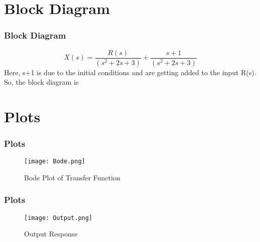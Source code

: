 \documentclass{beamer}
\theoremstyle{remark}
\numberwithin{equation}{section}
\begin{document}
\section{Block Diagram}
\begin{frame}
\frametitle{Block Diagram}
\begin{equation}
    X(s) = \frac{R(s)}{(s^2+2s+3)}+\frac{s+1}{(s^2+2s+3)}
\end{equation}
Here, s+1 is due to the initial conditions and are getting added to the input R(s). So, the block diagram is 

\vspace{5mm}


\end{frame}

\section{Plots}
\begin{frame}
\frametitle{Plots}
\begin{figure}[ht]
    \centering
    \texttt{[image: Bode.png]}
    \caption{Bode Plot of Transfer Function}
    \label{fig:my_label}
\end{figure}
\end{frame}

\begin{frame}
\frametitle{Plots}
\begin{figure}[ht]
    \centering
    \texttt{[image: Output.png]}
    \caption{Output Response}
    \label{fig:my_label}
\end{figure}
\end{frame}
\end{document}
